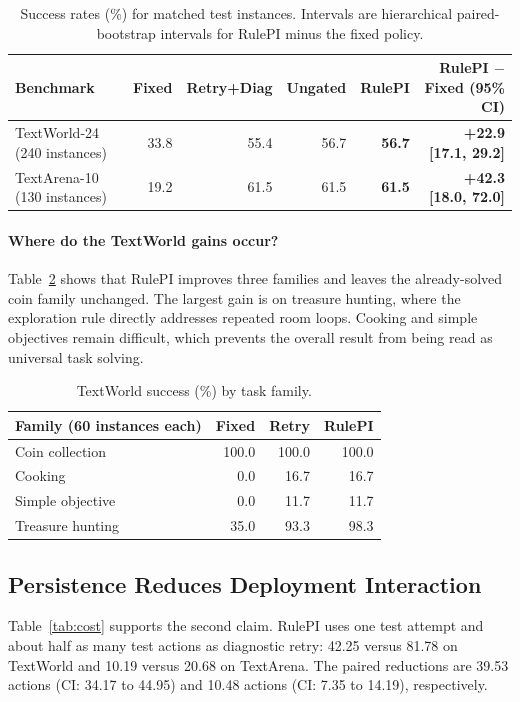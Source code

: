 \documentclass[11pt]{article}
\begin{document}
\begin{table}[t]
\centering
\small
\begin{tabular}{lrrrrr}
\toprule
Benchmark & Fixed & Retry+Diag & Ungated & RulePI & RulePI $-$ Fixed (95\% CI) \\
\midrule
TextWorld-24 (240 instances) & 33.8 & 55.4 & 56.7 & \textbf{56.7} & \textbf{+22.9 [17.1, 29.2]} \\
TextArena-10 (130 instances) & 19.2 & 61.5 & 61.5 & \textbf{61.5} & \textbf{+42.3 [18.0, 72.0]} \\
\bottomrule
\end{tabular}
\caption{Success rates (\%) for matched test instances. Intervals are hierarchical paired-bootstrap intervals for RulePI minus the fixed policy.}
\label{tab:success}
\end{table}

\paragraph{Where do the TextWorld gains occur?}
Table~\ref{tab:families} shows that RulePI improves three families and leaves the already-solved coin family unchanged.
The largest gain is on treasure hunting, where the exploration rule directly addresses repeated room loops.
Cooking and simple objectives remain difficult, which prevents the overall result from being read as universal task solving.

\begin{table}[t]
\centering
\small
\begin{tabular}{lrrr}
\toprule
Family (60 instances each) & Fixed & Retry & RulePI \\
\midrule
Coin collection & 100.0 & 100.0 & 100.0 \\
Cooking & 0.0 & 16.7 & 16.7 \\
Simple objective & 0.0 & 11.7 & 11.7 \\
Treasure hunting & 35.0 & 93.3 & 98.3 \\
\bottomrule
\end{tabular}
\caption{TextWorld success (\%) by task family.}
\label{tab:families}
\end{table}

\subsection{Persistence Reduces Deployment Interaction}

Table~\ref{tab:cost} supports the second claim.
RulePI uses one test attempt and about half as many test actions as diagnostic retry: 42.25 versus 81.78 on TextWorld and 10.19 versus 20.68 on TextArena.
The paired reductions are 39.53 actions (CI: 34.17 to 44.95) and 10.48 actions (CI: 7.35 to 14.19), respectively.
\end{document}
